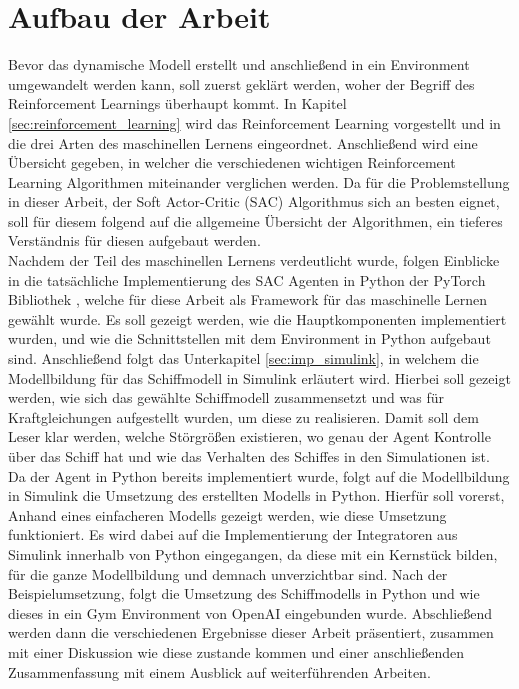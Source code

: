 \documentclass[]{iat}
\begin{document}
\section{Aufbau der Arbeit} \label{sec:aufbau_arbeit}
Bevor das dynamische Modell erstellt und anschließend in ein Environment umgewandelt werden kann, soll zuerst geklärt werden, woher der Begriff des Reinforcement Learnings überhaupt kommt. In Kapitel \ref{sec:reinforcement_learning} wird das Reinforcement Learning vorgestellt und in die drei Arten des maschinellen Lernens eingeordnet. Anschließend wird eine Übersicht gegeben, in welcher die verschiedenen wichtigen Reinforcement Learning Algorithmen miteinander verglichen werden. Da für die Problemstellung in dieser Arbeit, der Soft Actor-Critic (SAC) \cite[]{sac} Algorithmus sich an besten eignet, soll für diesem folgend auf die allgemeine Übersicht der Algorithmen, ein tieferes Verständnis für diesen aufgebaut werden.\\
Nachdem der Teil des maschinellen Lernens verdeutlicht wurde, folgen Einblicke in die tatsächliche Implementierung des SAC Agenten in Python der PyTorch Bibliothek \cite[]{pytorch}, welche für diese Arbeit als Framework für das maschinelle Lernen gewählt wurde. Es soll gezeigt werden, wie die Hauptkomponenten implementiert wurden, und wie die Schnittstellen mit dem Environment in Python aufgebaut sind. Anschließend folgt das Unterkapitel \ref{sec:imp_simulink}, in welchem die Modellbildung für das Schiffmodell in Simulink erläutert wird. Hierbei soll gezeigt werden, wie sich das gewählte Schiffmodell zusammensetzt und was für Kraftgleichungen aufgestellt wurden, um diese zu realisieren. Damit soll dem Leser klar werden, welche Störgrößen existieren, wo genau der Agent Kontrolle über das Schiff hat und wie das Verhalten des Schiffes in den Simulationen ist. Da der Agent in Python bereits implementiert wurde, folgt auf die Modellbildung in Simulink die Umsetzung des erstellten Modells in Python. Hierfür soll vorerst, Anhand eines einfacheren Modells gezeigt werden, wie diese Umsetzung funktioniert. Es wird dabei auf die Implementierung der Integratoren aus Simulink innerhalb von Python eingegangen, da diese mit ein Kernstück bilden, für die ganze Modellbildung und demnach unverzichtbar sind. Nach der Beispielumsetzung, folgt die Umsetzung des Schiffmodells in Python und wie dieses in ein Gym Environment von OpenAI \cite[]{brockman2016openai} eingebunden wurde. Abschließend werden dann die verschiedenen Ergebnisse dieser Arbeit präsentiert, zusammen mit einer Diskussion wie diese zustande kommen und einer anschließenden Zusammenfassung mit einem Ausblick auf weiterführenden Arbeiten.
\end{document}
